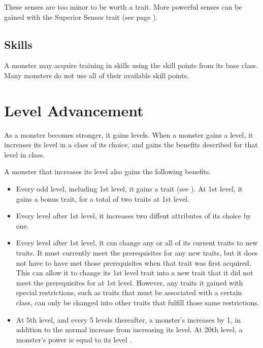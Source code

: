         These senses are too minor to be worth a trait.
        More powerful senses can be gained with the Superior Senses trait (see page ).

    \subsection{Skills}
        A monster may acquire training in skills using the skill points from its base class.
        Many monsters do not use all of their available skill points.

\section{Level Advancement}\label{Level Advancement}

    As a monster becomes stronger, it gains levels.
    When a monster gains a level, it increases its level in a class of its choice, and gains the benefits described for that level in class.

    A monster that increases its level also gains the following benefits.
    \begin{itemize}
        \item Every odd level, including 1st level, it gains a trait (see ).
            At 1st level, it gains a bonus trait, for a total of two traits at 1st level.
        \item Every level after 1st level, it increases two diffent attributes of its choice by one.
        \item Every level after 1st level, it can change any or all of its current traits to new traits.
            It must currently meet the prerequisites for any new traits, but it does not have to have met those prerequisites when that trait was first acquired.
            This can allow it to change its 1st level trait into a new trait that it did not meet the prerequisites for at 1st level.
            However, any traits it gained with special restrictions, such as traits that must be associated with a certain class, can only be changed into other traits that fulfill those same restrictions.
        \item At 5th level, and every 5 levels thereafter, a monster's  increases by 1, in addition to the normal increase from increasing its level.
            At 20th level, a monster's power is equal to its level .
    \end{itemize}
